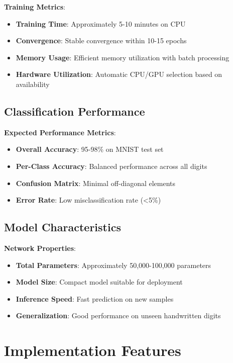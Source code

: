 \documentclass[12pt,a4paper]{article}
\begin{document}
\textbf{Training Metrics}:
\begin{itemize}
    \item \textbf{Training Time}: Approximately 5-10 minutes on CPU
    \item \textbf{Convergence}: Stable convergence within 10-15 epochs
    \item \textbf{Memory Usage}: Efficient memory utilization with batch processing
    \item \textbf{Hardware Utilization}: Automatic CPU/GPU selection based on availability
\end{itemize}

\subsection{Classification Performance}

\textbf{Expected Performance Metrics}:
\begin{itemize}
    \item \textbf{Overall Accuracy}: 95-98\% on MNIST test set
    \item \textbf{Per-Class Accuracy}: Balanced performance across all digits
    \item \textbf{Confusion Matrix}: Minimal off-diagonal elements
    \item \textbf{Error Rate}: Low misclassification rate (<5\%)
\end{itemize}

\subsection{Model Characteristics}

\textbf{Network Properties}:
\begin{itemize}
    \item \textbf{Total Parameters}: Approximately 50,000-100,000 parameters
    \item \textbf{Model Size}: Compact model suitable for deployment
    \item \textbf{Inference Speed}: Fast prediction on new samples
    \item \textbf{Generalization}: Good performance on unseen handwritten digits
\end{itemize}

\section{Implementation Features}
\end{document}
